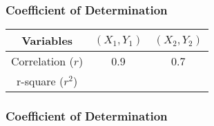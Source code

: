 \documentclass{beamer}
\begin{document}
\begin{frame}
\frametitle{Coefficient of Determination}
\huge
\vspace{-1cm}
\begin{tabular}{|c|c|c|}
\hline Variables & $(X_1,Y_1)$ & $(X_2,Y_2)$ \\ 
\hline Correlation ($r$) & 0.9 & 0.7 \\ 
\hline r-square ($r^2$) &  &  \\ 
\hline 
\end{tabular} 
\end{frame}
\begin{frame}
\frametitle{Coefficient of Determination}
\LARGE
\vspace{-1cm}
\end{frame}
\end{document}
